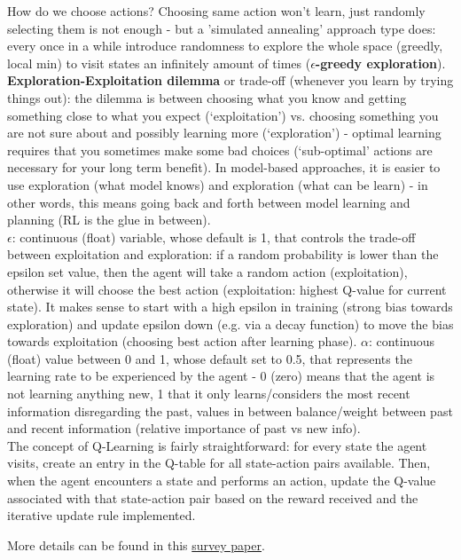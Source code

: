 \documentclass[11pt]{article}
\begin{document}
How do we choose actions? Choosing same action won't learn, just randomly selecting them is not enough - but a 'simulated annealing' approach type does: every once in a while introduce randomness to explore the whole space (greedly, local min) to visit states an infinitely amount of times (\textbf{$\epsilon$-greedy exploration}). \textbf{Exploration-Exploitation dilemma} or trade-off (whenever you learn by trying things out): the dilemma is between choosing what you know and getting something close to what you expect (‘exploitation’) vs. choosing something you are not sure about and possibly learning more (‘exploration’) - optimal learning requires that you sometimes make some bad choices (‘sub-optimal’ actions are necessary for your long term benefit). In model-based approaches, it is easier to use exploration (what model knows) and exploration (what can be learn) - in other words, this means going back and forth between model learning and planning (RL is the glue in between). \\
$\epsilon$: continuous (float) variable, whose default is 1, that controls the trade-off between exploitation and exploration: if a random probability is lower than the epsilon set value, then the agent will take a random action (exploitation), otherwise it will choose the best action (exploitation: highest Q-value for current state). It makes sense to start with a high epsilon in training (strong bias towards exploration) and update epsilon down (e.g. via a decay function) to move the bias towards exploitation (choosing best action after learning phase).   $\alpha$: continuous (float) value between 0 and 1, whose default set to 0.5, that represents the learning rate to be experienced by the agent - 0 (zero) means that the agent is not learning anything new, 1 that it only learns/considers the most recent information disregarding the past, values in between balance/weight between past and recent information (relative importance of past vs new info).\\
The concept of Q-Learning is fairly straightforward: for every state the agent visits, create an entry in the Q-table for all state-action pairs available. Then, when the agent encounters a state and performs an action, update the Q-value associated with that state-action pair based on the reward received and the iterative update rule implemented.

More details can be found in this \href{https://www.cs.cmu.edu/afs/cs/project/jair/pub/volume4/kaelbling96a.pdf}{survey paper}.
\end{document}
